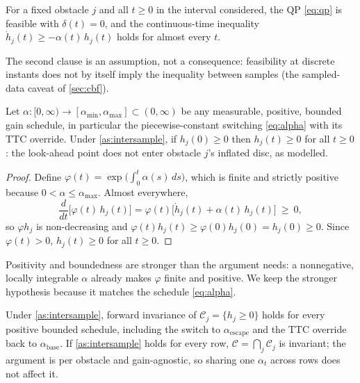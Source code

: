 \begin{assumption}\label{as:intersample}
For a fixed obstacle $j$ and all $t\ge0$ in the interval considered, the QP \eqref{eq:qp} is feasible with $\delta(t)=0$, and the continuous-time inequality $\dot h_j(t)\ge-\alpha(t)\,h_j(t)$ holds for almost every $t$.
\end{assumption}

The second clause is an assumption, not a consequence: feasibility at discrete instants does not by itself imply the inequality between samples (the sampled-data caveat of \cref{sec:cbf}).

\begin{proposition}\label{prop:invariance}
Let $\alpha:[0,\infty)\to[\alpha_{\min},\alpha_{\max}]\subset(0,\infty)$ be any measurable, positive, bounded gain schedule, in particular the piecewise-constant switching \eqref{eq:alpha} with its TTC override. Under \cref{as:intersample}, if $h_j(0)\ge0$ then $h_j(t)\ge0$ for all $t\ge0$: the look-ahead point does not enter obstacle $j$'s inflated disc, as modelled.
\end{proposition}

\begin{proof}
Define $\varphi(t)=\exp\big(\int_0^t\alpha(s)\,ds\big)$, which is finite and strictly positive because $0<\alpha\le\alpha_{\max}$. Almost everywhere,
\begin{equation}\label{eq:proof}
\frac{d}{dt}\big[\varphi(t)\,h_j(t)\big]=\varphi(t)\big[\dot h_j(t)+\alpha(t)\,h_j(t)\big]\ \ge\ 0,
\end{equation}
so $\varphi h_j$ is non-decreasing and $\varphi(t)h_j(t)\ge\varphi(0)h_j(0)=h_j(0)\ge0$. Since $\varphi(t)>0$, $h_j(t)\ge0$ for all $t\ge0$.
\end{proof}

Positivity and boundedness are stronger than the argument needs: a nonnegative, locally integrable $\alpha$ already makes $\varphi$ finite and positive. We keep the stronger hypothesis because it matches the schedule \eqref{eq:alpha}.

\begin{corollary}\label{cor:gain}
Under \cref{as:intersample}, forward invariance of $\mathcal{C}_j=\{h_j\ge0\}$ holds for every positive bounded schedule, including the switch to $\alpha_{\mathrm{escape}}$ and the TTC override back to $\alpha_{\mathrm{base}}$. If \cref{as:intersample} holds for every row, $\mathcal{C}=\bigcap_j\mathcal{C}_j$ is invariant; the argument is per obstacle and gain-agnostic, so sharing one $\alpha_t$ across rows does not affect it.
\end{corollary}


